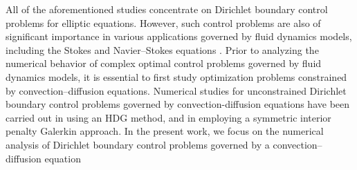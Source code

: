 \documentclass[a4paper,10pt]{article}
\numberwithin{theorem}{section}
\begin{document}
All of the aforementioned studies concentrate on Dirichlet boundary control problems for elliptic equations. However, such control problems are also of significant importance in various applications governed by fluid dynamics models, including the Stokes \cite{WGong_WHu_MMateos_JRSingler_YZhang_2020,WGong_MMateos_JSingler_YZhang_2022} and Navier–Stokes equations \cite{AVFursikov_MDGunzburger_LSHou_1998a,MHinze_KKunisch_2004}. Prior to analyzing the numerical behavior of complex optimal control problems governed by fluid dynamics models, it is essential to first study optimization problems constrained by convection–diffusion equations. Numerical studies for unconstrained Dirichlet boundary control problems governed by  convection-diffusion equations have been carried out in \cite{WGong_WHu_MMateos_JSingler_XZhang_YZhang_2018,WHu_MMateos_JSingler_YZhang_2018,HChen_JRSingler_YZhang_2019} using an HDG method, and in \cite{CCorekli_2022} employing a symmetric interior penalty Galerkin approach. 
In the present work, we focus on the numerical analysis of Dirichlet boundary control problems governed by a convection–diffusion equation 
\end{document}
